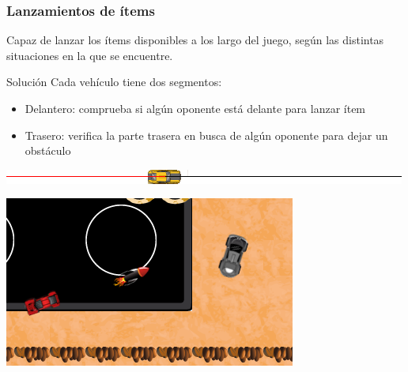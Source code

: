 \begin{frame}
    \frametitle{Lanzamientos de ítems}

    Capaz de lanzar los ítems disponibles a los largo del juego, según las
    distintas situaciones en la que se encuentre.

        \begin{block}{Solución}
        Cada vehículo tiene dos segmentos:
            \begin{itemize}
                \item Delantero: comprueba si algún oponente está delante para lanzar ítem
                \item Trasero: verifica la parte trasera en busca de algún oponente para dejar un obstáculo
            \end{itemize}
        \end{block}

        \begin{center}
                \includegraphics[scale=0.5]{imagenes/ia_segmentos.png}
        \end{center}

        \begin{center}
                \includegraphics[scale=0.5]{imagenes/ia_lanzar.png}
        \end{center}
\end{frame}

